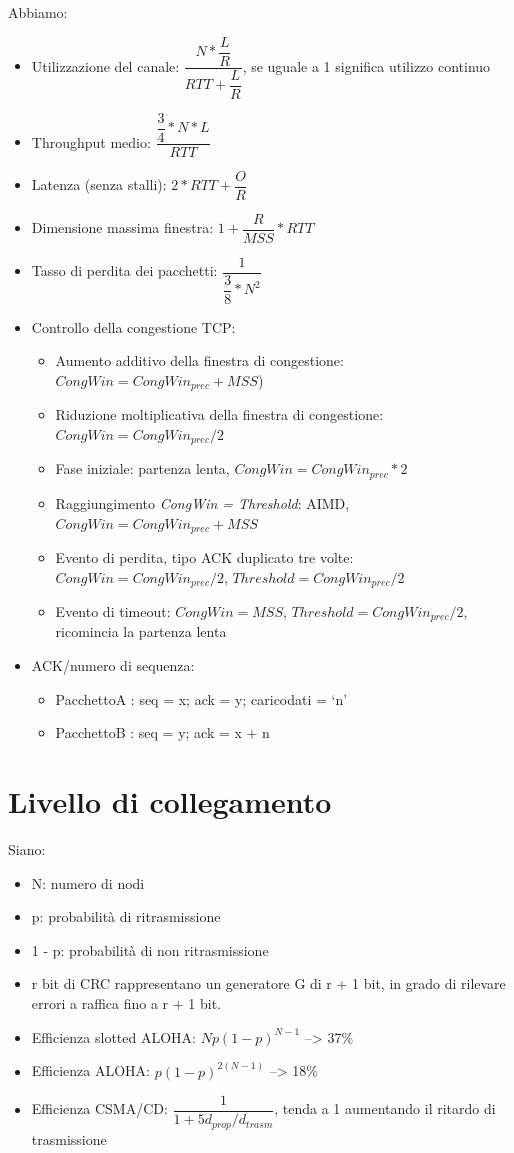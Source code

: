 \documentclass[11pt,a4paper]{book}
\begin{document}
Abbiamo:
\begin{itemize}
	\item Utilizzazione del canale: $\dfrac{N * \dfrac{L}{R}}{RTT + \dfrac{L}{R}}$, se uguale a 1 significa utilizzo continuo
	\item Throughput medio: $\dfrac{\dfrac{3}{4} * N * L}{RTT}$
	\item Latenza (senza stalli): $2 * RTT + \dfrac{O}{R}$
	\item Dimensione massima finestra: $1 + \dfrac{R}{MSS} * RTT$
	\item Tasso di perdita dei pacchetti: $\dfrac{1}{\dfrac{3}{8} * N^{2}}$
	\item Controllo della congestione TCP:
	\begin{itemize}
		\item Aumento additivo della finestra di congestione: $CongWin = CongWin_{prec} + MSS$)
		\item Riduzione moltiplicativa della finestra di congestione: $CongWin = CongWin_{prec}/2$
		\item Fase iniziale: partenza lenta, $CongWin = CongWin_{prec}*2$
		\item Raggiungimento \emph{CongWin = Threshold}: AIMD, $CongWin = CongWin_{prec} + MSS$
		\item Evento di perdita, tipo ACK duplicato tre volte: $CongWin = CongWin_{prec}/2$, $Threshold = CongWin_{prec}/2$
		\item Evento di timeout: $CongWin = MSS$, $Threshold = CongWin_{prec}/2$, ricomincia la partenza lenta
	\end{itemize}
	\item ACK/numero di sequenza:
	\begin{itemize}
		\item PacchettoA : seq = x; ack = y; caricodati = ‘n'
		\item PacchettoB : seq = y; ack = x + n
	\end{itemize}
\end{itemize}

\section{Livello di collegamento}
Siano:
\begin{itemize}
	\item N: numero di nodi
	\item p: probabilità di ritrasmissione
	\item 1 - p: probabilità di non ritrasmissione
\end{itemize}
\begin{itemize}
	\item r bit di CRC rappresentano un generatore G di r + 1 bit, in grado di rilevare errori a raffica fino a r + 1 bit.
	\item Efficienza slotted ALOHA: $Np(1 - p)^{N - 1}$ --> 37\%
	\item Efficienza ALOHA: $p(1 - p)^{2(N - 1)}$ --> 18\%
	\item Efficienza CSMA/CD: $\dfrac{1}{1 + 5d_{prop}/d_{trasm}}$, tenda a 1 aumentando il ritardo di trasmissione
\end{itemize}
\end{document}

